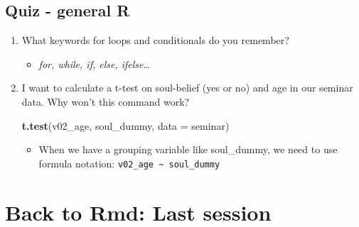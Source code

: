 \documentclass[
]{book}
\newenvironment{Shaded}{\begin{snugshade}}{\end{snugshade}}
\newcommand{\AttributeTok}[1]{\textcolor[rgb]{0.13,0.29,0.53}{#1}}
\newcommand{\FunctionTok}[1]{\textcolor[rgb]{0.13,0.29,0.53}{\textbf{#1}}}
\newcommand{\NormalTok}[1]{#1}
\providecommand{\tightlist}{%
  \setlength{\itemsep}{0pt}\setlength{\parskip}{0pt}}
\begin{document}
\subsection{Quiz - general R}\label{quiz---general-r-2}

\begin{enumerate}
\def\labelenumi{\arabic{enumi}.}
\setcounter{enumi}{4}
\item
  What keywords for loops and conditionals do you remember?

  \begin{itemize}
  \tightlist
  \item
    \emph{for, while, if, else, ifelse}\ldots{}
  \end{itemize}
\item
  I want to calculate a t-test on soul-belief (yes or no) and age in our seminar data. Why won't this command work?

\begin{Shaded}
\begin{Highlighting}[]
\FunctionTok{t.test}\NormalTok{(v02\_age, soul\_dummy, }\AttributeTok{data =}\NormalTok{ seminar)}
\end{Highlighting}
\end{Shaded}

  \begin{itemize}
  \tightlist
  \item
    When we have a grouping variable like soul\_dummy, we need to use formula notation: \texttt{v02\_age\ \textasciitilde{}\ soul\_dummy}
  \end{itemize}
\end{enumerate}

\section{Back to Rmd: Last session}\label{back-to-rmd-last-session}
\end{document}
